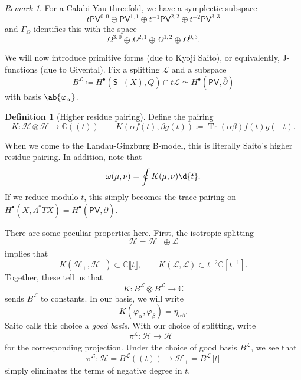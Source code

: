 \documentclass{amsart}
\theoremstyle{definition}
\newtheorem{defn}[thm]{Definition}
\theoremstyle{remark}
\newtheorem{rmk}[thm]{Remark}
\theoremstyle{plain}
\theoremstyle{definition}
\theoremstyle{remark}
\newcommand{\C}{\mathbb{C}}
\newcommand{\mc}[1]{\mathcal{#1}}
\newcommand{\on}[1]{\operatorname{#1}}
\newcommand{\ms}[1]{\mathsf{#1}}
\newcommand{\1}{\mathbf{1}}
\newcommand{\2}{\mathbf{2}}
\newcommand{\3}{\mathbf{3}}
\newcommand{\ps}[1]{\lBrack #1 \rBrack}
\newcommand{\ls}[1]{(\!( #1 )\!)}
\newcommand{\dbar}{\bar{\partial}}
\begin{document}
\begin{rmk}
    For a Calabi-Yau threefold, we have a symplectic subspace
    \[ t \ms{PV}^{0,0} \oplus \ms{PV}^{1,1} \oplus t^{-1} \ms{PV}^{2,2} \oplus t^{-2} \ms{PV}^{3,3} \]
    and \(\Gamma_{\Omega}\) identifies this with the space
    \[ \Omega^{3,0} \oplus \Omega^{2,1} \oplus \Omega^{1,2} \oplus \Omega^{0,3}.\]
\end{rmk}

We will now introduce primitive forms (due to Kyoji Saito), or equivalently, J-functions (due to Givental). Fix a splitting \(\mc{L}\) and a subspace
\[ B^{\mc{L}} \coloneqq H^{\bullet}(\ms{S}_+(X), Q) \cap t \mc{L} \simeq H^{\bullet}(\ms{PV}, \dbar) \]
with basis \(\ab\{\varphi_{\alpha}\}\).

\begin{defn}[Higher residue pairing]
    Define the pairing
    \[ K \colon \mc{H} \otimes \mc{H} \to \C\ls{t} \qquad K(\alpha f(t), \beta g(t)) \coloneqq \on{Tr}(\alpha \beta) f(t) g(-t). \]
\end{defn}
When we come to the Landau-Ginzburg B-model, this is literally Saito's higher residue pairing. In addition, note that
\[ \omega(\mu, \nu) = \oint K(\mu, \nu) \d{t}. \]
If we reduce modulo \(t\), this simply becomes the trace pairing on \(H^{\bullet}(X, \Lambda^* TX) = H^{\bullet}(\ms{PV}, \dbar)\). 

There are some peculiar properties here. First, the isotropic splitting
\[ \mc{H} = \mc{H}_+ \oplus \mc{L} \]
implies that
\[ K(\mc{H}_+, \mc{H}_+) \subset \C \ps{t}, \qquad K(\mc{L}, \mc{L}) \subset t^{-2} \C[t^{-1}]. \]
Together, these tell us that
\[ K \colon B^{\mc{L}} \otimes B^{\mc{L}} \to \C \]
sends \(B^{\mc{L}}\) to constants. In our basis, we will write
\[ K(\varphi_{\alpha}, \varphi_{\beta}) = \eta_{\alpha \beta}. \]
Saito calls this choice a \textit{good basis}. With our choice of splitting, write
\[ \pi_+^{\mc{L}} \colon \mc{H} \to \mc{H}_+ \]
for the corresponding projection. Under the choice of good basis \(B^{\mc{L}}\), we see that
\[ \pi_{+}^{\mc{L}} \colon \mc{H} = B^{\mc{L}} \ls{t} \to \mc{H}_+ = B^{\mc{L}} \ps{t} \]
simply eliminates the terms of negative degree in \(t\).
\end{document}
